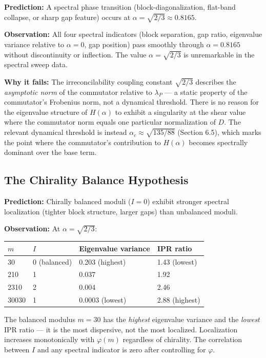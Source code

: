 \documentclass[11pt,letterpaper]{article}
\theoremstyle{definition}
\theoremstyle{remark}
\begin{document}
\textbf{Prediction:} A spectral phase transition (block-diagonalization, flat-band collapse, or sharp gap feature) occurs at $\alpha = \sqrt{2/3} \approx 0.8165$.

\textbf{Observation:} All four spectral indicators (block separation, gap ratio, eigenvalue variance relative to $\alpha = 0$, gap position) pass smoothly through $\alpha = 0.8165$ without discontinuity or inflection. The value $\alpha = \sqrt{2/3}$ is unremarkable in the spectral sweep data.

\textbf{Why it fails:} The irreconcilability coupling constant $\sqrt{2/3}$ describes the \emph{asymptotic norm} of the commutator relative to $\lambda_P$ --- a static property of the commutator's Frobenius norm, not a dynamical threshold. There is no reason for the eigenvalue structure of $H(\alpha)$ to exhibit a singularity at the shear value where the commutator norm equals one particular normalization of $D$. The relevant dynamical threshold is instead $\alpha_c \approx \sqrt{135/88}$ (Section 6.5), which marks the point where the commutator's contribution to $H(\alpha)$ becomes spectrally dominant over the base term.

\subsection{The Chirality Balance Hypothesis}\label{the-chirality-balance-hypothesis-1}

\textbf{Prediction:} Chirally balanced moduli ($I = 0$) exhibit stronger spectral localization (tighter block structure, larger gaps) than unbalanced moduli.

\textbf{Observation:} At $\alpha = \sqrt{2/3}$:

\begin{longtable}[]{@{}llll@{}}
\toprule
$m$ & $I$ & Eigenvalue variance & IPR ratio \\
\midrule
\endhead
\bottomrule
30 & 0 (balanced) & 0.203 (highest) & 1.43 (lowest) \\
210 & 1 & 0.037 & 1.92 \\
2310 & 2 & 0.004 & 2.46 \\
30030 & 1 & 0.0003 (lowest) & 2.88 (highest) \\
\end{longtable}

The balanced modulus $m = 30$ has the \emph{highest} eigenvalue variance and the \emph{lowest} IPR ratio --- it is the most dispersive, not the most localized. Localization increases monotonically with $\varphi(m)$ regardless of chirality. The correlation between $I$ and any spectral indicator is zero after controlling for $\varphi$.
\end{document}
